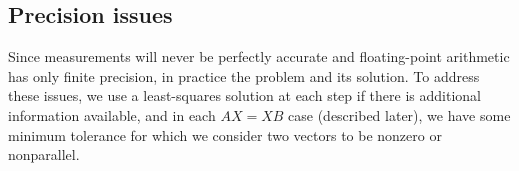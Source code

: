 \subsection{Precision issues}
Since measurements will never be perfectly accurate and floating-point arithmetic has only finite precision,
in practice the problem and its solution. To address these issues, we use a least-squares solution at 
each step if there is additional information available, and in each $AX = XB$ case (described later),
we have some minimum tolerance for which we consider two vectors to be nonzero or nonparallel.

